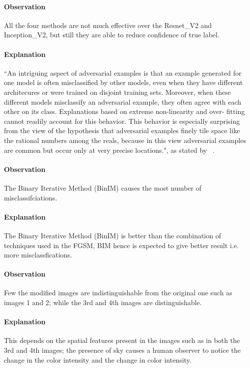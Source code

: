 \documentclass[letterpaper]{article}
\begin{document}
\paragraph{Observation} All the four methods are not much effective over the Resnet\_V2 and Inception\_V2, but still they are able to reduce confidence of true label.
\paragraph{Explanation}``An intriguing aspect of adversarial examples is that an example generated for one model is often misclassified by other models, even when they have different architecures or were trained on disjoint training sets. Moreover, when these different models misclassify an adversarial example, they often agree with each other on its class.   Explanations based on extreme non-linearity and over-
fitting cannot readily account for this behavior. This behavior is especially surprising from the view of the hypothesis that adversarial examples finely tile space like the rational numbers among the reals, because in this view adversarial examples are common but
occur only at very precise locations.", as stated by  ~\cite{goodfellow2014explaining}.

\paragraph{Observation} The Binary Iterative Method (BinIM) causes the most number of misclassifciations.
\paragraph{Explanation} The Binary Iterative Method (BinIM) is better than the combination of techniques used in the FGSM, BIM hence is expected to give better result i.e. more misclassfications.



\paragraph{Observation} Few the modified images are indistinguishable from the original one such as images 1 and 2; while the 3rd and 4th images are distinguishable.


\paragraph{Explanation} This depends on the spatial features present in the images such as in both the 3rd and 4th images; the presence of sky causes a human observer to notice the change in the color intensity and the change in color intensity.
\end{document}
